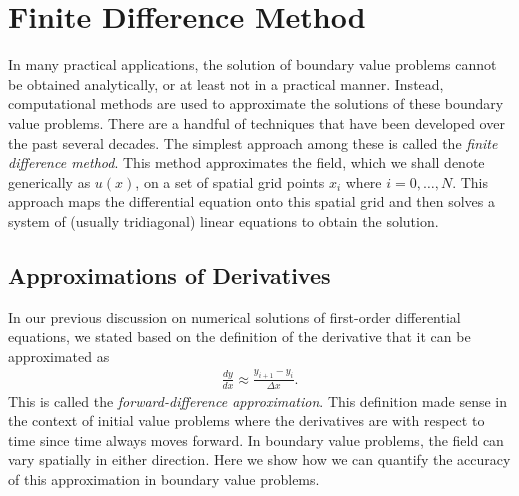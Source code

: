 \section{Finite Difference Method} \label{Sec:ode_finiteDifference}

In many practical applications, the solution of boundary value problems cannot be obtained analytically, or at least not in a practical manner. Instead, computational methods are used to approximate the solutions of these boundary value problems. There are a handful of techniques that have been developed over the past several decades. The simplest approach among these is called the \emph{finite difference method}. This method approximates the field, which we shall denote generically as $u(x)$, on a set of spatial grid points $x_i$ where $i = 0, \ldots, N$. This approach maps the differential equation onto this spatial grid and then solves a system of (usually tridiagonal) linear equations to obtain the solution.

\subsection{Approximations of Derivatives}

In our previous discussion on numerical solutions of first-order differential equations, we stated based on the definition of the derivative that it can be approximated as
\begin{align}
  \frac{dy}{dx} \approx \frac{ y_{i+1} - y_i }{ \Delta x } .
\end{align}
This is called the \emph{forward-difference approximation}. This definition made sense in the context of initial value problems where the derivatives are with respect to time since time always moves forward. In boundary value problems, the field can vary spatially in either direction. Here we show how we can quantify the accuracy of this approximation in boundary value problems. 

